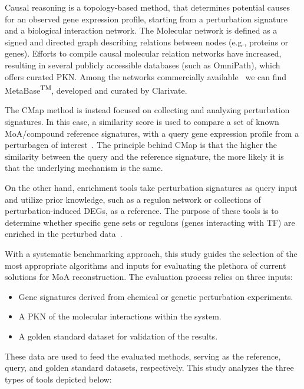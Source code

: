Causal reasoning is a topology-based method, that determines potential causes for an observed gene expression profile, starting from a perturbation signature and a biological interaction network. 
The \gls{Molecular network} is defined as a signed and directed graph describing relations between nodes (e.g., proteins or genes). 
Efforts to compile causal molecular relation networks have increased, resulting in several publicly accessible databases (such as OmniPath), which offers curated \gls{PKN}. 
Among the networks commercially available~\cite{RN32} we can find MetaBase\textsuperscript{TM}, developed and curated by Clarivate.

The \gls{CMap} method is instead focused on collecting and analyzing perturbation signatures. 
In this case, a similarity score is used to compare a set of known \gls{MoA}/compound reference signatures, with a query gene expression profile from a perturbagen of interest~\cite{RN34, RN38}.
The principle behind \gls{CMap} is that the higher the similarity between the query and the reference signature, the more likely it is that the underlying mechanism is the same. 

On the other hand, enrichment tools take perturbation signatures as query input and utilize prior knowledge, such as a regulon network or collections of perturbation-induced \gls{DEGs}, as a reference. 
The purpose of these tools is to determine whether specific gene sets or regulons (genes interacting with \gls{TF}) are enriched in the perturbed data~\cite{RN35}.

With a systematic benchmarking approach, this study guides the selection of the most appropriate algorithms and inputs for evaluating the plethora of current solutions for \gls{MoA} reconstruction.
The evaluation process relies on three inputs:

\begin{itemize}
  \item \gls{Gene signature}s derived from chemical or genetic perturbation experiments.
  \item A \gls{PKN} of the molecular interactions within the system. 
  \item A golden standard dataset for validation of the results.
\end{itemize}

These data are used to feed the evaluated methods, serving as the reference, query, and golden standard datasets, respectively. 
This study analyzes the three types of tools depicted below: 

